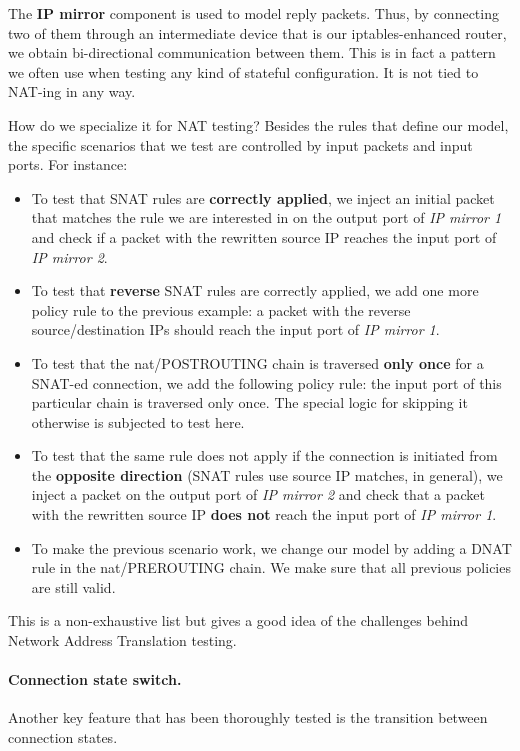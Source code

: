 The \textbf{IP mirror} component is used to model reply packets.  Thus, by
connecting two of them through an intermediate device that is our
iptables-enhanced router, we obtain bi-directional communication between them.
This is in fact a pattern we often use when testing any kind of stateful
configuration.  It is not tied to NAT-ing in any way.

How do we specialize it for NAT testing?  Besides the rules that define our
model, the specific scenarios that we test are controlled by input packets and
input ports.  For instance:
\begin{itemize}
  \item To test that SNAT rules are \textbf{correctly applied}, we inject an
    initial packet that matches the rule we are interested in on the output
    port of \emph{IP mirror 1} and check if a packet with the rewritten source
    IP reaches the input port of \emph{IP mirror 2}.
  \item To test that \textbf{reverse} SNAT rules are correctly applied, we add
    one more policy rule to the previous example: a packet with the reverse
    source/destination IPs should reach the input port of \emph{IP mirror 1}.
  \item To test that the nat/POSTROUTING chain is traversed \textbf{only once}
    for a SNAT-ed connection, we add the following policy rule: the input port
    of this particular chain is traversed only once.  The special logic for
    skipping it otherwise is subjected to test here.
  \item To test that the same rule does not apply if the connection is
    initiated from the \textbf{opposite direction} (SNAT rules use source IP
    matches, in general), we inject a packet on the output port of \emph{IP
    mirror 2} and check that a packet with the rewritten source IP \textbf{does
    not} reach the input port of \emph{IP mirror 1}.
  \item To make the previous scenario work, we change our model by adding a
    DNAT rule in the nat/PREROUTING chain.  We make sure that all previous
    policies are still valid.
\end{itemize}

This is a non-exhaustive list but gives a good idea of the challenges behind
Network Address Translation testing.

\paragraph{Connection state switch.}
Another key feature that has been thoroughly tested is the transition between
connection states.

